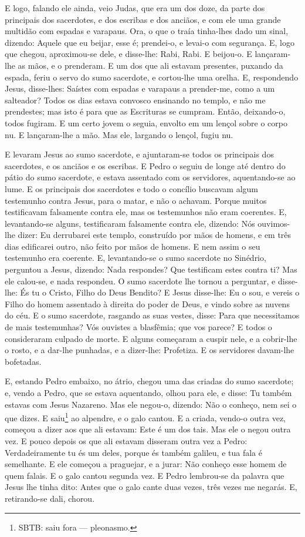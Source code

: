 E logo, falando ele ainda, veio Judas, que era um dos doze, da
parte dos principais dos sacerdotes, e dos escribas e dos anciãos, e
com ele uma grande multidão com espadas e varapaus. Ora, o
que o traía tinha-lhes dado um sinal, dizendo: Aquele que eu beijar,
esse é; prendei-o, e levai-o com segurança. E, logo que
chegou, aproximou-se dele, e disse-lhe: Rabi, Rabi. E beijou-o.
E lançaram-lhe as mãos, e o prenderam. E um dos que
ali estavam presentes, puxando da espada, feriu o servo do sumo
sacerdote, e cortou-lhe uma orelha. E, respondendo Jesus,
disse-lhes: Saístes com espadas e varapaus a prender-me, como a um
salteador? Todos os dias estava convosco ensinando no templo,
e não me prendestes; mas isto é para que as Escrituras se cumpram.
Então, deixando-o, todos fugiram. E um certo jovem o
seguia, envolto em um lençol sobre o corpo nu. E lançaram-lhe a mão.
Mas ele, largando o lençol, fugiu nu.

E levaram Jesus ao sumo sacerdote, e ajuntaram-se todos os
principais dos sacerdotes, e os anciãos e os escribas. E
Pedro o seguiu de longe até dentro do pátio do sumo sacerdote, e
estava assentado com os servidores, aquentando-se ao lume. E
os principais dos sacerdotes e todo o concílio buscavam algum
testemunho contra Jesus, para o matar, e não o achavam.
Porque muitos testificavam falsamente contra ele, mas os
testemunhos não eram coerentes. E, levantando-se alguns,
testificaram falsamente contra ele, dizendo: Nós ouvimos-lhe
dizer: Eu derrubarei este templo, construído por mãos de homens, e
em três dias edificarei outro, não feito por mãos de homens.
E nem assim o seu testemunho era coerente. E,
levantando-se o sumo sacerdote no Sinédrio, perguntou a Jesus,
dizendo: Nada respondes? Que testificam estes contra ti? Mas
ele calou-se, e nada respondeu. O sumo sacerdote lhe tornou a
perguntar, e disse-lhe: És tu o Cristo, Filho do Deus Bendito?
E Jesus disse-lhe: Eu o sou, e vereis o Filho do homem
assentado à direita do poder de Deus, e vindo sobre as nuvens do
céu. E o sumo sacerdote, rasgando as suas vestes, disse: Para
que necessitamos de mais testemunhas? Vós ouvistes a
blasfêmia; que vos parece? E todos o consideraram culpado de morte.
E alguns começaram a cuspir nele, e a cobrir-lhe o rosto, e a
dar-lhe punhadas, e a dizer-lhe: Profetiza. E os servidores
davam-lhe bofetadas.

E, estando Pedro embaixo, no átrio, chegou uma das criadas do
sumo sacerdote; e, vendo a Pedro, que se estava aquentando,
olhou para ele, e disse: Tu também estavas com Jesus Nazareno.
Mas ele negou-o, dizendo: Não o conheço, nem sei o que dizes.
E saiu\footnote{SBTB: saiu fora --- pleonasmo.} ao alpendre, e o
galo cantou. E a criada, vendo-o outra vez, começou a dizer
aos que ali estavam: Este é um dos tais. Mas ele o negou
outra vez. E pouco depois os que ali estavam disseram outra vez a
Pedro: Verdadeiramente tu és um deles, porque és também galileu, e
tua fala é semelhante. E ele começou a praguejar, e a jurar:
Não conheço esse homem de quem falais. E o galo cantou
segunda vez. E Pedro lembrou-se da palavra que Jesus lhe tinha dito:
Antes que o galo cante duas vezes, três vezes me negarás. E,
retirando-se dali, chorou.

